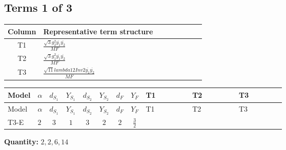 \documentclass[8pt]{article}
\begin{document}
\begin{landscape}
\subsection*{Terms 1 of 3}
\begin{center}
\begin{tabular}{@{}c >{\raggedright\arraybackslash}p{0.82\linewidth}@{}}
\toprule
Column & Representative term structure \\
\midrule
T1 & \(\displaystyle \frac{\sqrt{3} g_{2}^{2} \overline{y_{1}} \overline{y_{2}}}{MF}\) \\
\midrule
T2 & \(\displaystyle \frac{\sqrt{3} g_{1}^{2} \overline{y_{1}} \overline{y_{2}}}{MF}\) \\
\midrule
T3 & \(\displaystyle \frac{\sqrt{11} lambda12Inv2 \overline{y_{1}} \overline{y_{2}}}{MF}\) \\
\midrule
\bottomrule
\end{tabular}
\end{center}
\smallskip
\tiny
\begin{longtable}{@{}llcccccc >{\raggedright\arraybackslash}p{0.21\linewidth} >{\raggedright\arraybackslash}p{0.21\linewidth} >{\raggedright\arraybackslash}p{0.21\linewidth}@{}}
\toprule
Model & $\alpha$ & $d_{S_1}$ & $Y_{S_1}$ & $d_{S_2}$ & $Y_{S_2}$ & $d_F$ & $Y_F$ & T1 & T2 & T3 \\
\midrule
\endfirsthead
\toprule
Model & $\alpha$ & $d_{S_1}$ & $Y_{S_1}$ & $d_{S_2}$ & $Y_{S_2}$ & $d_F$ & $Y_F$ & T1 & T2 & T3 \\
\midrule
\endhead
T3-E & $2$ & $3$ & $1$ & $3$ & $2$ & $2$ & $\frac{3}{2}$ & \scriptsize\adjustbox{max width=\linewidth}{$\begin{gathered} - \frac{49 \sqrt{3} g_{2}^{2} \overline{y_{1}} \overline{y_{2}}}{24 MF}\end{gathered}$} & \scriptsize\adjustbox{max width=\linewidth}{$\begin{gathered} - \frac{9 \sqrt{3} g_{1}^{2} \overline{y_{1}} \overline{y_{2}}}{8 MF}\end{gathered}$} & \scriptsize\adjustbox{max width=\linewidth}{$\begin{gathered} - \frac{3 \sqrt{11} lambda12Inv2 \overline{y_{1}} \overline{y_{2}}}{22 MF}\end{gathered}$} \\
\midrule
\bottomrule
\end{longtable}
\clearpage
\noindent\textbf{Quantity: }$\mathrm{2,2,6,14}$\par\smallskip

\end{landscape}
\end{document}
